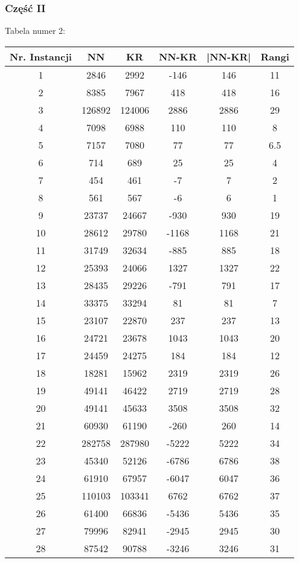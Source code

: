 \documentclass{article}
\begin{document}
\subsubsection{Część II}
Tabela numer 2:
\begin{table}[h!]
\centering
\begin{tabular}{c||c|c||c|c||c}
Nr. Instancji & NN & KR & NN-KR & |NN-KR| & Rangi \\
\hline
1 & 2846 & 2992 & -146 & 146 & 11 \\
2 & 8385 & 7967 & 418 & 418 & 16 \\
3 & 126892 & 124006 & 2886 & 2886 & 29 \\
4 & 7098 & 6988 & 110 & 110 & 8 \\
5 & 7157 & 7080 & 77 & 77 & 6.5 \\
6 & 714 & 689 & 25 & 25 & 4 \\
7 & 454 & 461 & -7 & 7 & 2 \\
8 & 561 & 567 & -6 & 6 & 1 \\
9 & 23737 & 24667 & -930 & 930 & 19 \\
10 & 28612 & 29780 & -1168 & 1168 & 21 \\
11 & 31749 & 32634 & -885 & 885 & 18 \\
12 & 25393 & 24066 & 1327 & 1327 & 22 \\
13 & 28435 & 29226 & -791 & 791 & 17 \\
14 & 33375 & 33294 & 81 & 81 & 7 \\
15 & 23107 & 22870 & 237 & 237 & 13 \\
16 & 24721 & 23678 & 1043 & 1043 & 20 \\
17 & 24459 & 24275 & 184 & 184 & 12 \\
18 & 18281 & 15962 & 2319 & 2319 & 26 \\
19 & 49141 & 46422 & 2719 & 2719 & 28 \\
20 & 49141 & 45633 & 3508 & 3508 & 32 \\
21 & 60930 & 61190 & -260 & 260 & 14 \\
22 & 282758 & 287980 & -5222 & 5222 & 34 \\
23 & 45340 & 52126 & -6786 & 6786 & 38 \\
24 & 61910 & 67957 & -6047 & 6047 & 36 \\
25 & 110103 & 103341 & 6762 & 6762 & 37 \\
26 & 61400 & 66836 & -5436 & 5436 & 35 \\
27 & 79996 & 82941 & -2945 & 2945 & 30 \\
28 & 87542 & 90788 & -3246 & 3246 & 31 \\

\end{tabular}
\end{table}
\end{document}

